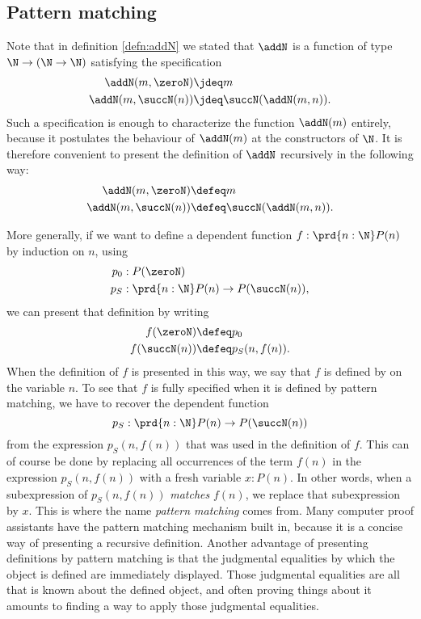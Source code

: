 \subsection{Pattern matching}

Note that in definition \cref{defn:addN} we stated that $\addN$ is a function of type $\N\to (\N\to\N)$ satisfying the specification
\begin{align*}
    \addN(m,\zeroN) & \jdeq m \\
  \addN(m,\succN(n)) & \jdeq \succN(\addN(m,n)).
\end{align*}
Such a specification is enough to characterize the function $\addN(m)$ entirely, because it postulates the behaviour of $\addN(m)$ at the constructors of $\N$.
It is therefore convenient to present the definition of $\addN$ recursively in the following way:
\begin{align*}
  \addN(m,\zeroN) & \defeq m \\
  \addN(m,\succN(n)) & \defeq \succN(\addN(m,n)).
\end{align*}

More generally, if we want to define a dependent function $f:\prd{n:\N}P(n)$ by induction on $n$, using
\begin{align*}
  p_0 & : P(\zeroN) \\
  p_S & : \prd{n:\N} P(n)\to P(\succN(n)),
\end{align*}
we can present that definition by writing
\begin{align*}
  f(\zeroN) & \defeq p_0 \\
  f(\succN(n)) & \defeq p_S(n,f(n)). 
\end{align*}
When the definition of $f$ is presented in this way, we say that $f$ is defined by  on the variable $n$. To see that $f$ is fully specified when it is defined by pattern matching, we have to recover the dependent function
\begin{equation*}
  p_S:\prd{n:\N}P(n)\to P(\succN(n))
\end{equation*}
from the expression $p_S(n,f(n))$ that was used in the definition of $f$. This can of course be done by replacing all occurrences of the term $f(n)$ in the expression $p_S(n,f(n))$ with a fresh variable $x:P(n)$. In other words, when a subexpression of $p_S(n,f(n))$ \emph{matches} $f(n)$, we replace that subexpression by $x$. This is where the name \emph{pattern matching} comes from. Many computer proof assistants have the pattern matching mechanism built in, because it is a concise way of presenting a recursive definition. Another advantage of presenting definitions by pattern matching is that the judgmental equalities by which the object is defined are immediately displayed. Those judgmental equalities are all that is known about the defined object, and often proving things about it amounts to finding a way to apply those judgmental equalities.

